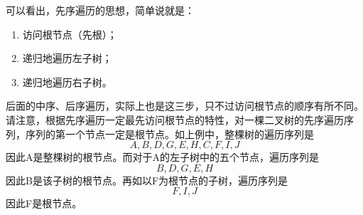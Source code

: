 可以看出，先序遍历的思想，简单说就是：
\begin{enumerate}
    \item 访问根节点（先根）；
    \item 递归地遍历左子树；
    \item 递归地遍历右子树。
\end{enumerate}
后面的中序、后序遍历，实际上也是这三步，只不过访问根节点的顺序有所不同。\\

请注意，根据先序遍历一定最先访问根节点的特性，对一棵二叉树的先序遍历序列，序列的第一个节点一定是根节点。如上例中，整棵树的遍历序列是
\[
    A,B,D,G,E,H,C,F,I,J
\]
因此A是整棵树的根节点。而对于A的左子树中的五个节点，遍历序列是
\[
    B,D,G,E,H
\]
因此B是该子树的根节点。再如以F为根节点的子树，遍历序列是
\[
    F,I,J
\]
因此F是根节点。

